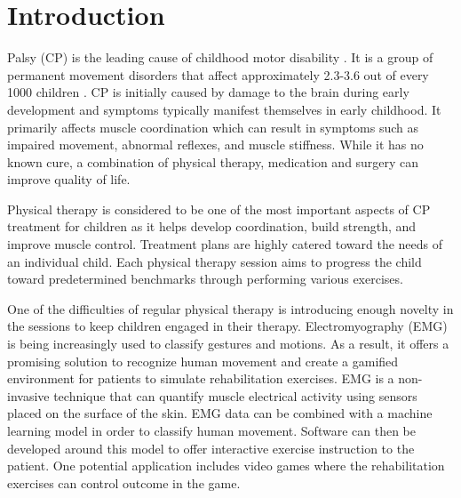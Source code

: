 \documentclass[journal]{IEEEtran}
\begin{document}






%
\IEEEpeerreviewmaketitle



\section{Introduction}
\label{sec:intro}
 Palsy (CP) is the leading cause of childhood motor disability \cite{cdcgov2020}. It is a group of permanent movement disorders that affect approximately 2.3-3.6 out of every 1000 children \cite{cporg2020}. CP is initially caused by damage to the brain during early development and symptoms typically manifest themselves in early childhood. It primarily affects muscle coordination which can result in symptoms such as impaired movement, abnormal reflexes, and muscle stiffness. While it has no known cure, a combination of physical therapy, medication and surgery can improve quality of life. 

Physical therapy is considered to be one of the most important aspects of CP treatment for children as it helps develop coordination, build strength, and improve muscle control. Treatment plans are highly catered toward the needs of an individual child. Each physical therapy session aims to progress the child toward predetermined benchmarks through performing various exercises. 

One of the difficulties of regular physical therapy is introducing enough novelty in the sessions to keep children engaged in their therapy. Electromyography (EMG) is being increasingly used to classify gestures and motions. As a result, it offers a promising solution to recognize human movement and create a gamified environment for patients to simulate rehabilitation exercises. EMG is a non-invasive technique that can quantify muscle electrical activity using sensors placed on the surface of the skin. EMG data can be combined with a machine learning model in order to classify human movement. Software can then be developed around this model to offer interactive exercise instruction to the patient. One potential application includes video games where the rehabilitation exercises can control outcome in the game.
\end{document}
